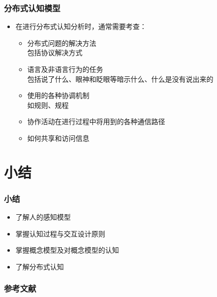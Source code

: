 \documentclass{beamer}
\begin{document}
\begin{frame}
	\frametitle{分布式认知模型}
	\beamertemplatetransparentcovereddynamicmedium
	\begin{itemize}
		\item 在进行分布式认知分析时，通常需要考查：\pause
		\begin{itemize}
			\item 分布式问题的解决方法\\{\tiny 包括协议解决方式}\pause
			\item 语言及非语言行为的任务\\{\tiny 包括说了什么、眼神和眨眼等暗示什么、什么是没有说出来的}\pause
			\item 使用的各种协调机制\\{\tiny 如规则、规程}\pause
			\item 协作活动在进行过程中将用到的各种通信路径\pause
			\item 如何共享和访问信息
		\end{itemize}
	\end{itemize}
\end{frame}

\section{小结}
\begin{frame}
	\frametitle{小结}
	\begin{itemize}
		\item 了解人的感知模型
		\item 掌握认知过程与交互设计原则
		\item 掌握概念模型及对概念模型的认知
		\item 了解分布式认知
	\end{itemize}
\end{frame}
 
\begin{frame}
	\frametitle{参考文献}
	
	
\end{frame}
\end{document}
